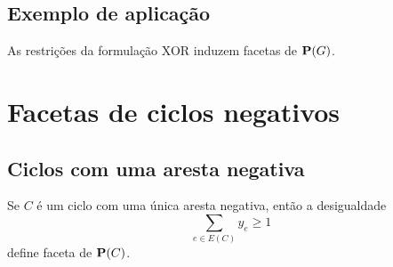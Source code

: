 \documentclass[
12pt,notheorems,hyperref={pdfauthor=whatever}
]{beamer}
\begin{document}
\subsection{Exemplo de aplicação}

\begin{frame}

    \begin{prop}
        As restrições da formulação XOR induzem facetas de $\mathbf{P}(G)$.
    \end{prop}


    \vspace{-.5em}
    \begin{figure}[h]
        \centering
        
        {}
    \end{figure}
    
\end{frame}

\section{Facetas de ciclos negativos}
\subsection{Ciclos com uma aresta negativa}
\begin{frame}
    \begin{lemma} \label{lem:ciclo1}
        {Se $C$ é um ciclo com uma única aresta negativa, então a desigualdade
        \begin{equation}\label{eq:ciclo1}
        \sum_{e\in E(C)}y_e \geq 1   
        \end{equation}
        define faceta de $\mathbf{P}(C)$.}
    \end{lemma}
\end{frame}
\end{document}

